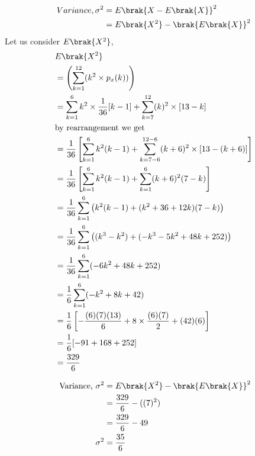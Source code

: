 \begin{align}
  Variance,\sigma^2 &= E\brak{X-E\brak{X}}^2 \\
    &= E\brak{X^2} - \brak{E\brak{X}}^2
\end{align}
Let us consider $E\brak{X^2}$,
\begin{align}
    & E\brak{X^2} \nonumber\\
    &= \left(\sum_{k=1}^{12}(k^2\times p_x(k))\right)\\
    &= \sum_{k=1}^{6}k^2\times\frac{1}{36}[k-1] + 
    \sum_{k=7}^{12}(k)^2\times[13-k]\\
    &\text{by rearrangement we get}\\
    &= \frac{1}{36}\left[\sum_{k=1}^{6}k^2(k-1) + \sum_{k=7-6}^{12-6}(k+6)^2\times[13-(k+6)]\right]\\
    &= \frac{1}{36}\left[\sum_{k=1}^{6}k^2(k-1) + \sum_{k=1}^{6}(k+6)^2(7-k)\right]\\
    &= \frac{1}{36}\sum_{k=1}^{6}\left(k^2(k-1) + (k^2+36+12k)(7-k)\right)\\
    &= \frac{1}{36}\sum_{k=1}^{6}\left((k^3-k^2) + (-k^3-5k^2+48k+252)\right)\\
    &= \frac{1}{36}\sum_{k=1}^{6}(-6k^2+48k+252)\\
    &= \frac{1}{6}\sum_{k=1}^{6}(-k^2+8k+42)\\
    &= \frac{1}{6}\left[ -\frac{(6)(7)(13)}{6} + 8\times\frac{(6)(7)}{2}+ (42)(6) \right]\\
    &= \frac{1}{6}[-91+168+252]\\
    &= \frac{329}{6}
\end{align}

\begin{align}
    \text{ Variance, }\sigma^2 &=E\brak{X^2} - \brak{E\brak{X}}^2\\
    &= \frac{329}{6}- ((7)^2)\\
    &= \frac{329}{6} - 49\\
   \sigma^2 &= \frac{35}{6}
\end{align}